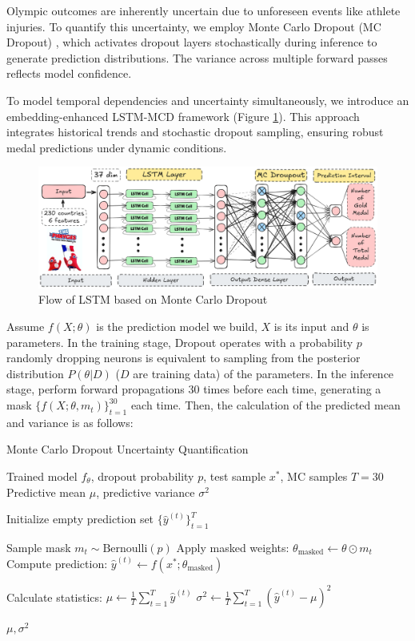 \documentclass{mcmthesis}
\begin{document}
 \hspace{1.5em}Olympic outcomes are inherently uncertain due to unforeseen events like athlete injuries. To quantify this uncertainty, we employ Monte Carlo Dropout (MC Dropout) \cite{gal2016dropout}, which activates dropout layers stochastically during inference to generate prediction distributions. The variance across multiple forward passes reflects model confidence.

To model temporal dependencies and uncertainty simultaneously, we introduce an embedding-enhanced LSTM-MCD framework (Figure \ref{fig:LSTM-MCD}). This approach integrates historical trends and stochastic dropout sampling, ensuring robust medal predictions under dynamic conditions.
	\begin{figure}[H]
	\centering
	\includegraphics[width=1\linewidth]{fig/LSTM-MCD.png}
	\caption{Flow of LSTM based on Monte Carlo Dropout}
	\label{fig:LSTM-MCD}
    \end{figure}
  Assume $f(X;\theta)$ is the prediction model we build, $X$ is its input and $\theta$ is parameters. In the training stage, Dropout operates with a probability $p$
randomly dropping neurons is equivalent to sampling from the posterior distribution $P(\theta|D)$ ($D$ are training data) of the parameters. In the inference stage, perform forward propagations $30$ times before each time, generating a mask $\{f(X;\theta,m_t)\}_{t=1}^{30}$ each time. Then, the calculation of the predicted mean and variance is as follows:
\begin{algorithm}
	\caption{Monte Carlo Dropout Uncertainty Quantification}
	\begin{algorithmic}[1]
		\Require Trained model $f_\theta$, dropout probability $p$, test sample $x^*$, MC samples $T=30$
		\Ensure Predictive mean $\mu$, predictive variance $\sigma^2$
		
		\State Initialize empty prediction set $\{\hat{y}^{(t)}\}_{t=1}^T$
		
		\State Sample mask $m_t \sim \text{Bernoulli}(p)$ 
		\State Apply masked weights: $\theta_{\text{masked}} \gets \theta \odot m_t$
		\State Compute prediction: $\hat{y}^{(t)} \gets f(x^*; \theta_{\text{masked}})$
		\EndFor
		
		\State Calculate statistics:
		\State $\mu \gets \frac{1}{T}\sum_{t=1}^T \hat{y}^{(t)}$ 
		\State $\sigma^2 \gets \frac{1}{T}\sum_{t=1}^T (\hat{y}^{(t)} - \mu)^2$ 
		\EndFor
		
		\State \Return $\mu, \sigma^2$
	\end{algorithmic}
\end{algorithm}
\end{document}
